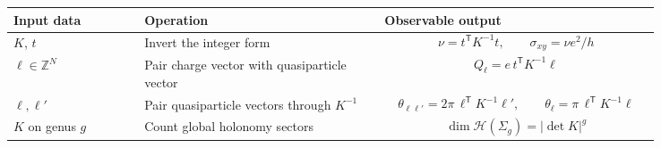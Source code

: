 \begingroup
\small
\renewcommand{\arraystretch}{1.45}
\begin{center}
\begin{tabular}{@{}p{0.18\linewidth}p{0.33\linewidth}p{0.33\linewidth}@{}}
\hline
Input data & Operation & Observable output \\
\hline
$K$, $t$ &
Invert the integer form &
\[
\nu=t^{\mathsf T}K^{-1}t,
\qquad
\sigma_{xy}=\nu e^2/h
\]
\\
\hline
$\ell\in\mathbb{Z}^N$ &
Pair charge vector with quasiparticle vector &
\[
Q_\ell=e\,t^{\mathsf T}K^{-1}\ell
\]
\\
\hline
$\ell,\ell'$ &
Pair quasiparticle vectors through $K^{-1}$ &
\[
\theta_{\ell\ell'}
=2\pi\,\ell^{\mathsf T}K^{-1}\ell',
\qquad
\theta_\ell=\pi\,\ell^{\mathsf T}K^{-1}\ell
\]
\\
\hline
$K$ on genus $g$ &
Count global holonomy sectors &
\[
\dim\mathcal{H}(\Sigma_g)=|\det K|^g
\]
\\
\hline
\end{tabular}
\end{center}
\endgroup
